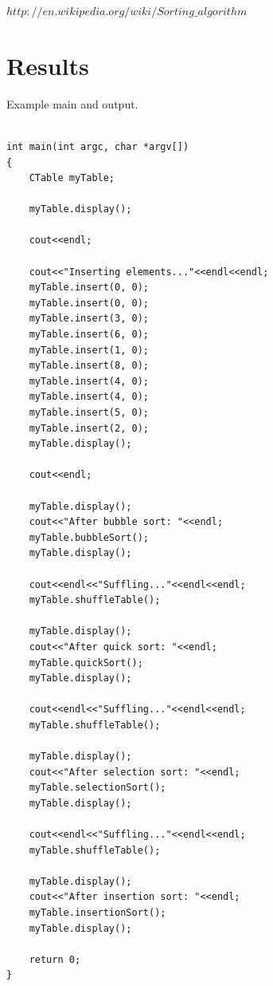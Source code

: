 \documentclass{article}
\begin{document}
$http://en.wikipedia.org/wiki/Sorting\_algorithm$


\section{Results}

Example main and output.

\begin{lstlisting}[label=main-cpp, caption=main.cpp]
	
int main(int argc, char *argv[])
{
    CTable myTable;

    myTable.display();

    cout<<endl;

    cout<<"Inserting elements..."<<endl<<endl;
    myTable.insert(0, 0);
    myTable.insert(0, 0);
    myTable.insert(3, 0);
    myTable.insert(6, 0);
    myTable.insert(1, 0);
    myTable.insert(8, 0);
    myTable.insert(4, 0);
    myTable.insert(4, 0);
    myTable.insert(5, 0);
    myTable.insert(2, 0);
    myTable.display();

    cout<<endl;

    myTable.display();
    cout<<"After bubble sort: "<<endl;
    myTable.bubbleSort();
    myTable.display();

    cout<<endl<<"Suffling..."<<endl<<endl;
    myTable.shuffleTable();

    myTable.display();
    cout<<"After quick sort: "<<endl;
    myTable.quickSort();
    myTable.display();

    cout<<endl<<"Suffling..."<<endl<<endl;
    myTable.shuffleTable();

    myTable.display();
    cout<<"After selection sort: "<<endl;
    myTable.selectionSort();
    myTable.display();

    cout<<endl<<"Suffling..."<<endl<<endl;
    myTable.shuffleTable();

    myTable.display();
    cout<<"After insertion sort: "<<endl;
    myTable.insertionSort();
    myTable.display();

    return 0;
}

\end{lstlisting}
\end{document}
